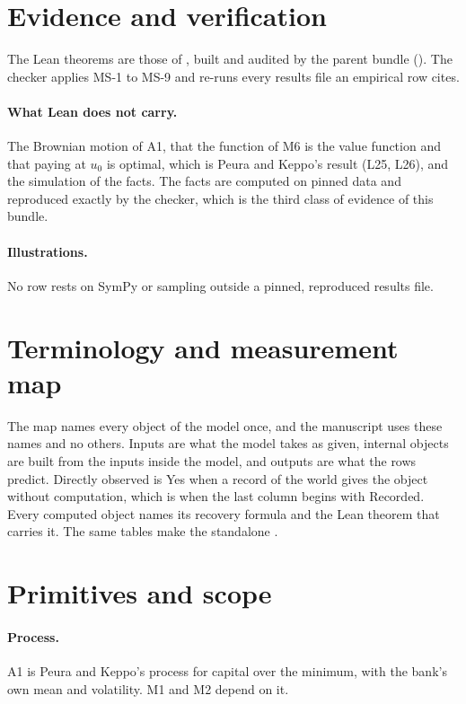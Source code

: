 \section{Evidence and verification}\label{app:evidence}

The Lean theorems are those of , built and audited by the
parent bundle (). The checker
 applies MS-1 to MS-9 and
re-runs every results file an empirical row cites.

\paragraph{What Lean does not carry.} The Brownian motion of A1, that the
function of M6 is the value function and that paying at $u_0$ is optimal,
which is Peura and Keppo's result (L25, L26), and the simulation of the facts. The
facts are computed on pinned data and reproduced exactly by the checker,
which is the third class of evidence of this bundle.

\paragraph{Illustrations.} No row rests on SymPy or sampling outside a
pinned, reproduced results file.

\section{Terminology and measurement map}\label{app:terms}

The map names every object of the model once, and the manuscript uses these
names and no others. Inputs are what the model takes as given, internal
objects are built from the inputs inside the model, and outputs are what the
rows predict. Directly observed is Yes when a record of the world gives the
object without computation, which is when the last column begins with
Recorded. Every computed object names its recovery formula and the Lean
theorem that carries it. The same tables make the standalone
.



\section{Primitives and scope}\label{app:scope}

\paragraph{Process.} A1 is Peura and Keppo's process for capital over the
minimum, with the bank's own mean and volatility. M1 and M2 depend on it.

